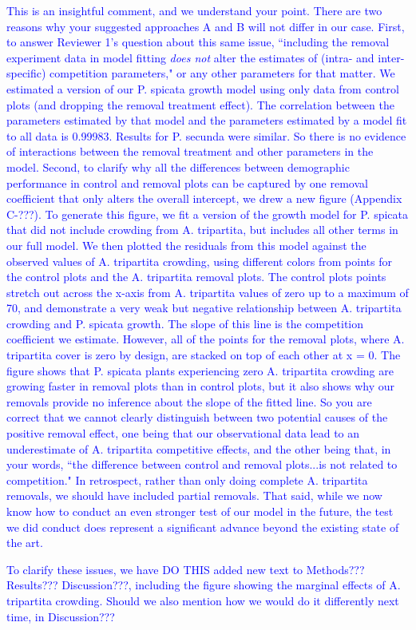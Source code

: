 \documentclass[12pt]{article}
\newcommand{\response}{\textcolor{blue}}
\begin{document}
\response{ This is an insightful comment, and we understand your point. There are two reasons why your suggested approaches A and B will not differ in our case. First, to answer Reviewer 1's question about this same issue, ``including the removal experiment data in model fitting \emph{does not} alter the estimates of (intra- and inter-specific) competition parameters," or any other parameters for that matter. We estimated a version of our P. spicata growth model using only data from control plots (and dropping the removal treatment effect). The correlation between the parameters estimated by that model and the parameters estimated by a model fit to all data is 0.99983. Results for P. secunda were similar.  So there is no evidence of interactions between the removal treatment and other parameters in the model. Second, to clarify why all the differences between demographic performance in control and removal plots can be captured by one removal coefficient that only alters the overall intercept, we drew a new figure (Appendix C-???). To generate this figure, we fit a version of the growth model for P. spicata that did not include crowding from A. tripartita, but includes all other terms in our full model. We then plotted the residuals from this model against the observed values of A. tripartita crowding, using different colors from points for the control plots and the A. tripartita removal plots. The control plots points stretch out across the x-axis from A. tripartita values of zero up to a maximum of 70, and demonstrate a very weak but negative relationship between A. tripartita crowding and P. spicata growth. The slope of this line is the competition coefficient we estimate. However, all of the points for the removal plots, where A. tripartita cover is zero by design, are stacked on top of each other at x = 0. The figure shows that P. spicata plants experiencing zero A. tripartita crowding are growing faster in removal plots than in control plots, but it also shows why our removals provide no inference about the slope of the fitted line. So you are correct that we cannot clearly distinguish between two potential causes of the positive removal effect, one being that our observational data lead to an underestimate of A. tripartita competitive effects, and the other being that, in your words, ``the difference between control and removal plots...is not related to competition."  In retrospect, rather than only doing complete A. tripartita removals, we should have included partial removals. That said, while we now know how to conduct an even stronger test of our model in the future, the test we did conduct does represent a significant advance beyond the existing state of the art.

To clarify these issues, we have DO THIS added new text to Methods??? Results??? Discussion???, including the figure showing the marginal effects of A. tripartita crowding. Should we also mention how we would do it differently next time, in Discussion???}
\end{document}
